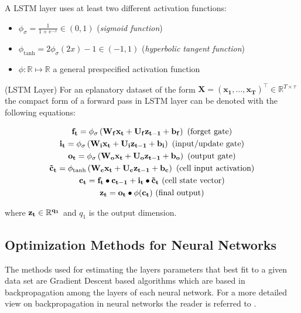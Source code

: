 \documentclass[a4paper, oneside]{discothesis}
\begin{document}
A LSTM layer uses at least two different activation functions:
\begin{itemize}
    \item $\phi_\sigma = \frac{1}{1+e^{-x}} \in (0,1)$ (\textit{sigmoid function})
    \item $\phi_{\text{tanh}} = 2\phi_\sigma(2x)-1 \in (-1,1)$ (\textit{hyperbolic tangent function})
    \item $\phi: \mathbb{R}\mapsto\mathbb{R}$ a general prespecified activation function
\end{itemize}

(LSTM Layer) For an eplanatory dataset of the form $\bm{X} = \left(\bm{x_1}, \dots, \bm{x_T}\right)^\intercal\in \mathbb{R}^{T\times \tau} $ the compact form of a forward pass in LSTM layer can be denoted with the following equations:

\begin{gather}
    \bf{f_t} = \phi_\sigma\left(\bf{W_f}\bf{x_t}+\bf{U_f}\bf{z_{t-1}+\bf{b_f}}\right) \text{  (forget gate)}\\
    \bf{i_t} = \phi_\sigma\left(\bf{W_i}\bf{x_t}+\bf{U_i}\bf{z_{t-1}+\bf{b_i}}\right) \text{  (input/update gate)}\\
    \bf{o_t} = \phi_\sigma\left(\bf{W_o}\bf{x_t}+\bf{U_o}\bf{z_{t-1}+\bf{b_o}}\right) \text{  (output gate)}\\
    \bf{\tilde{c}_t} = \phi_{\text{tanh}}\left(\bf{W_c}\bf{x_t}+\bf{U_c}\bf{z_{t-1}+\bf{b_c}}\right) \text{   (cell input activation)}\\
    \bf{c_t} = \bf{f_t}\bullet \bf{c_{t-1}}+\bf{i_t}\bullet\bf{\tilde{c}_t} \text{  (cell state vector)}\\
    \bf{z_t} = \bf{o_t}\bullet\phi(\bf{c_t}) \text{  (final output)}
\end{gather}

where $\bf{z_t}\in\mathbb{R}^{q_1}$ and $q_1$ is the output dimension.

\subsection{Optimization Methods for Neural Networks}\label{ssec:num1}

The methods used for estimating the layers parameters that best fit to a given data set are Gradient Descent based algorithms which are based in backpropagation \cite{Linnainmaa1976} among the layers of each neural network. For a more detailed view on backpropagation in neural networks the reader is referred to \cite{murphyMLProba}.
\end{document}
